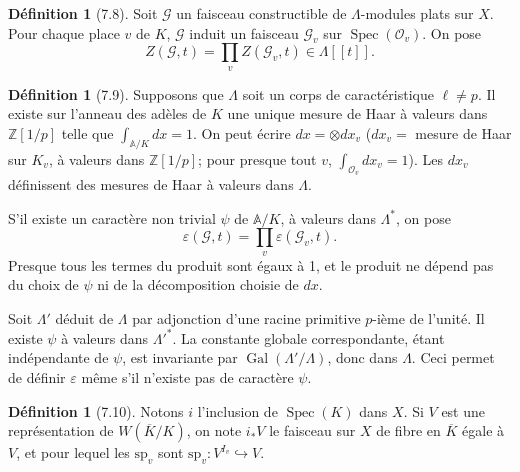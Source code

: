 \documentclass[11pt]{amsart}
\theoremstyle{plain}
\theoremstyle{definition}
\newtheorem{definition}[theorem]{D\'efinition}
\DeclareMathOperator{\Gal}{Gal}
\DeclareMathOperator{\Spec}{Spec}
\begin{document}
\begin{definition}[7.8]
Soit $\mathcal{G}$ un faisceau constructible de $\Lambda$-modules plats sur $X$. Pour chaque place $v$ de $K$, $\mathcal{G}$ induit un faisceau $\mathcal{G}_v$ sur $\Spec(\mathcal{O}_v)$. On pose
\begin{equation}
Z(\mathcal{G},t) = \prod_v Z(\mathcal{G}_v,t) \in \Lambda[[t]].
\tag{7.8.0}
\end{equation}
\end{definition}

\begin{definition}[7.9]
Supposons que $\Lambda$ soit un corps de caract\'eristique $\ell \not= p$. Il existe sur l'anneau des ad\`eles de $K$ une unique mesure de Haar \`a valeurs dans $\mathbb{Z}[1/p]$ telle que $\int_{\mathbb{A}/K} dx = 1$. On peut \'ecrire $dx = \otimes dx_v$ ($dx_v =$ mesure de Haar sur $K_v$, \`a valeurs dans $\mathbb{Z}[1/p]$; pour presque tout $v$, $\int_{\mathcal{O}_v} dx_v = 1$). Les $dx_v$ d\'efinissent des mesures de Haar \`a valeurs dans $\Lambda$.

S'il existe un caract\`ere non trivial $\psi$ de $\mathbb{A}/K$, \`a valeurs dans $\Lambda^*$, on pose
\begin{equation}
\varepsilon(\mathcal{G},t) = \prod_v \varepsilon(\mathcal{G}_v,t).
\tag{7.9.0}
\end{equation}
Presque tous les termes du produit sont \'egaux \`a 1, et le produit ne d\'epend pas du choix de $\psi$ ni de la d\'ecomposition choisie de $dx$.

Soit $\Lambda'$ d\'eduit de $\Lambda$ par adjonction d'une racine primitive $p$-i\`eme de l'unit\'e. Il existe $\psi$ \`a valeurs dans $\Lambda'^*$. La constante globale correspondante, \'etant ind\'ependante de $\psi$, est invariante par $\Gal(\Lambda'/\Lambda)$, donc dans $\Lambda$. Ceci permet de d\'efinir $\varepsilon$ m\^eme s'il n'existe pas de caract\`ere $\psi$.
\end{definition}

\begin{definition}[7.10]
Notons $i$ l'inclusion de $\Spec(K)$ dans $X$. Si $V$ est une repr\'esentation de $W(\overline{K}/K)$, on note $i_*V$ le faisceau sur $X$ de fibre en $\overline{K}$ \'egale \`a $V$, et pour lequel les $\mathrm{sp}_v$ sont $\mathrm{sp}_v: V^{I_v} \hookrightarrow V$.
\end{definition}
\end{document}
